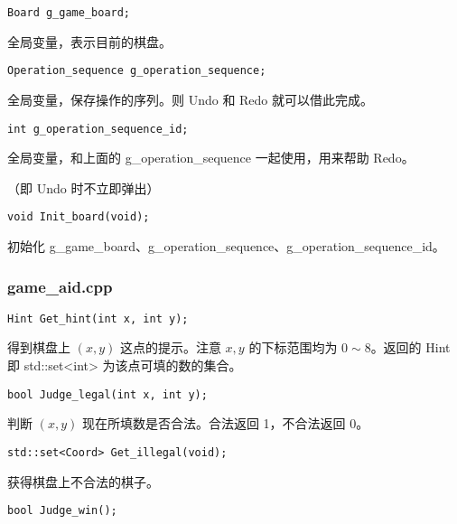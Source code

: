 \documentclass{article}
\begin{document}
    \begin{lstlisting}
Board g_game_board;
    \end{lstlisting}

    全局变量，表示目前的棋盘。

    \begin{lstlisting}
Operation_sequence g_operation_sequence;
    \end{lstlisting}

    全局变量，保存操作的序列。则 Undo 和 Redo 就可以借此完成。

    \begin{lstlisting}
int g_operation_sequence_id;
    \end{lstlisting}

    全局变量，和上面的 g\_operation\_sequence 一起使用，用来帮助 Redo。
    
    （即 Undo 时不立即弹出）

    \begin{lstlisting}
void Init_board(void);
    \end{lstlisting}

    初始化 g\_game\_board、g\_operation\_sequence、g\_operation\_sequence\_id。

    \subsubsection{game\_aid.cpp}

    \begin{lstlisting}
Hint Get_hint(int x, int y);
    \end{lstlisting}

    得到棋盘上 $(x, y)$ 这点的提示。注意 $x, y$ 的下标范围均为 $0\sim 8$。返回的 Hint 即 std::set<int> 为该点可填的数的集合。

    \begin{lstlisting}
bool Judge_legal(int x, int y);
    \end{lstlisting}

判断 $(x, y)$ 现在所填数是否合法。合法返回 1，不合法返回 0。

    \begin{lstlisting}
std::set<Coord> Get_illegal(void);
    \end{lstlisting}

    获得棋盘上不合法的棋子。

    \begin{lstlisting}
bool Judge_win();
    \end{lstlisting}
\end{document}
